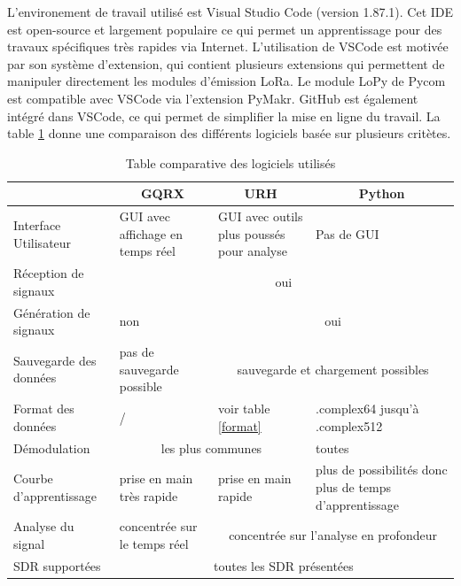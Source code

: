 \newpage

L'environement de travail utilisé est Visual Studio Code (version 1.87.1). Cet \ac{IDE} est open-source et largement populaire ce qui permet un apprentissage pour des travaux spécifiques très rapides via Internet. L'utilisation de VSCode est motivée par son système d'extension, qui contient plusieurs extensions qui permettent de manipuler directement les modules d'émission \ac{LoRa}. Le module LoPy de Pycom est compatible avec VSCode via l'extension PyMakr. GitHub est également intégré dans VSCode, ce qui permet de simplifier la mise en ligne du travail. La table \ref{table2} donne une comparaison des différents logiciels basée sur plusieurs critètes.

\begin{table}[h]
\centering
\begin{tabular}{|p{4cm}|p{2cm}|p{2cm}|p{3.5cm}|}
\hline
\multicolumn{1}{|c|}{} & \multicolumn{1}{c|}{GQRX} & \multicolumn{1}{c|}{URH} & \multicolumn{1}{c|}{Python}\\
\hline
Interface Utilisateur & GUI avec affichage en temps réel & GUI avec outils plus poussés pour analyse & Pas de GUI \\
\hline
Réception de signaux & \multicolumn{3}{c|}{oui} \\
\hline
Génération de signaux & non & \multicolumn{2}{c|}{oui} \\
\hline
Sauvegarde des données & pas de sauvegarde possible & \multicolumn{2}{c|}{sauvegarde et chargement possibles} \\
\hline
Format des données & / & voir table \ref{format} & .complex64 jusqu'à .complex512 \\
\hline
Démodulation &  \multicolumn{2}{c|}{les plus communes\footnotemark[12]}  & toutes\\
\hline
Courbe d'apprentissage & prise en main très rapide & prise en main rapide & plus de possibilités donc plus de temps d'apprentissage \\
\hline
Analyse du signal & concentrée sur le temps réel & \multicolumn{2}{c|}{concentrée sur l'analyse en profondeur} \\
\hline
SDR supportées & \multicolumn{3}{c|}{toutes les SDR présentées} \\
\hline
\end{tabular}
\caption{Table comparative des logiciels utilisés}
\label{table2}
\end{table}


